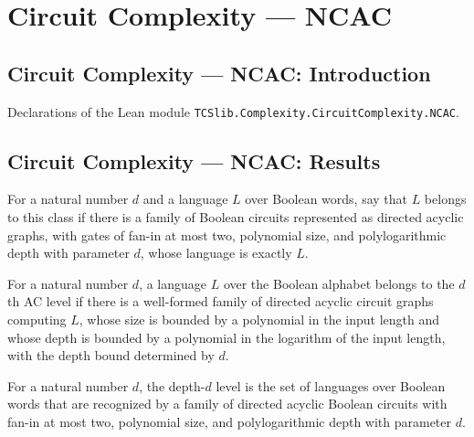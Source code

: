 \section{Circuit Complexity --- NCAC}
\subsection*{Circuit Complexity --- NCAC: Introduction}

Declarations of the Lean module \texttt{TCSlib.Complexity.CircuitComplexity.NCAC}.

\subsection*{Circuit Complexity --- NCAC: Results}

\begin{definition}
\label{Language.InNC}
\leanok
{}
For a natural number $d$ and a language $L$ over Boolean words, say that $L$ belongs to
this class if there is a family of Boolean circuits represented as directed acyclic
graphs, with gates of fan-in at most two, polynomial size, and polylogarithmic depth
with parameter $d$, whose language is exactly $L$.
\end{definition}

\begin{definition}
\label{Language.InAC}
\leanok
{}
For a natural number $d$, a language $L$ over the Boolean alphabet belongs to the $d$th
AC level if there is a well-formed family of directed acyclic circuit graphs computing
$L$, whose size is bounded by a polynomial in the input length and whose depth is
bounded by a polynomial in the logarithm of the input length, with the depth bound
determined by $d$.
\end{definition}

\begin{definition}
\label{BoolCircuit.NCLevel}
\leanok
{}
For a natural number $d$, the depth-$d$ level is the set of languages over Boolean words
that are recognized by a family of directed acyclic Boolean circuits with fan-in at most
two, polynomial size, and polylogarithmic depth with parameter $d$.
\end{definition}

